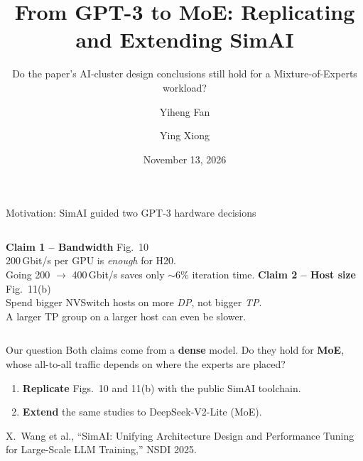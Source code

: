 \documentclass[aspectratio=169,11pt]{beamer}
\title{From GPT-3 to MoE: Replicating and Extending SimAI}
\subtitle{Do the paper's AI-cluster design conclusions still hold for a Mixture-of-Experts workload?}
\author{Yiheng Fan \and Ying Xiong}
\institute{CS514 Advanced Networking \quad\textbullet\quad Final Presentation}
\date{November 13, 2026}
\newcommand{\src}[1]{\par\vfill{\scriptsize\color{cgray}#1}}
\begin{document}
\maketitle

\begin{frame}{Motivation: SimAI guided two GPT-3 hardware decisions}
\begin{columns}[T,onlytextwidth]
\textbf{\color{cblue}Claim 1 -- Bandwidth} \hfill {\scriptsize Fig.~10}\\[2pt]
200\,Gbit/s per GPU is \emph{enough} for H20.\\
Going 200 $\to$ 400\,Gbit/s saves only $\sim$6\% iteration time.
\textbf{\color{cblue}Claim 2 -- Host size} \hfill {\scriptsize Fig.~11(b)}\\[2pt]
Spend bigger NVSwitch hosts on more \emph{DP}, not bigger \emph{TP}.\\
A larger TP group on a larger host can even be slower.
\end{columns}

\vspace{0.8em}
\begin{alertblock}{Our question}
Both claims come from a \textbf{dense} model.
Do they hold for \textbf{MoE}, whose all-to-all traffic depends on where the experts are placed?
\end{alertblock}

\begin{enumerate}\small
  \item \textbf{Replicate} Figs.~10 and 11(b) with the public SimAI toolchain.
  \item \textbf{Extend} the same studies to DeepSeek-V2-Lite (MoE).
\end{enumerate}
\src{X.~Wang et al., ``SimAI: Unifying Architecture Design and Performance Tuning for Large-Scale LLM Training,'' NSDI 2025.}
\end{frame}
\end{document}
